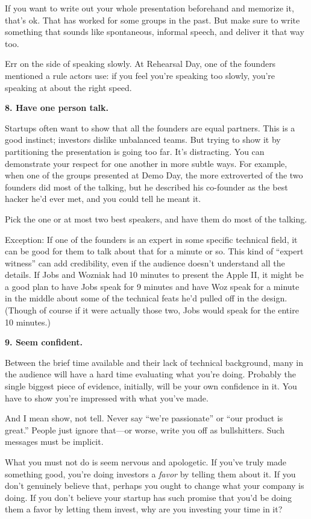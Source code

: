 If you want to write out your whole presentation beforehand and memorize
it, that's ok. That has worked for some groups in the past. But make
sure to write something that sounds like spontaneous, informal speech,
and deliver it that way too.

Err on the side of speaking slowly. At Rehearsal Day, one of the
founders mentioned a rule actors use: if you feel you're speaking too
slowly, you're speaking at about the right speed.

\textbf{8. Have one person talk.}

Startups often want to show that all the founders are equal partners.
This is a good instinct; investors dislike unbalanced teams. But trying
to show it by partitioning the presentation is going too far. It's
distracting. You can demonstrate your respect for one another in more
subtle ways. For example, when one of the groups presented at Demo Day,
the more extroverted of the two founders did most of the talking, but he
described his co-founder as the best hacker he'd ever met, and you could
tell he meant it.

Pick the one or at most two best speakers, and have them do most of the
talking.

Exception: If one of the founders is an expert in some specific
technical field, it can be good for them to talk about that for a minute
or so. This kind of ``expert witness'' can add credibility, even if the
audience doesn't understand all the details. If Jobs and Wozniak had 10
minutes to present the Apple II, it might be a good plan to have Jobs
speak for 9 minutes and have Woz speak for a minute in the middle about
some of the technical feats he'd pulled off in the design. (Though of
course if it were actually those two, Jobs would speak for the entire 10
minutes.)

\textbf{9. Seem confident.}

Between the brief time available and their lack of technical background,
many in the audience will have a hard time evaluating what you're doing.
Probably the single biggest piece of evidence, initially, will be your
own confidence in it. You have to show you're impressed with what you've
made.

And I mean show, not tell. Never say ``we're passionate'' or ``our
product is great.'' People just ignore that---or worse, write you off as
bullshitters. Such messages must be implicit.

What you must not do is seem nervous and apologetic. If you've truly
made something good, you're doing investors a \emph{favor} by telling
them about it. If you don't genuinely believe that, perhaps you ought to
change what your company is doing. If you don't believe your startup has
such promise that you'd be doing them a favor by letting them invest,
why are you investing your time in it?

